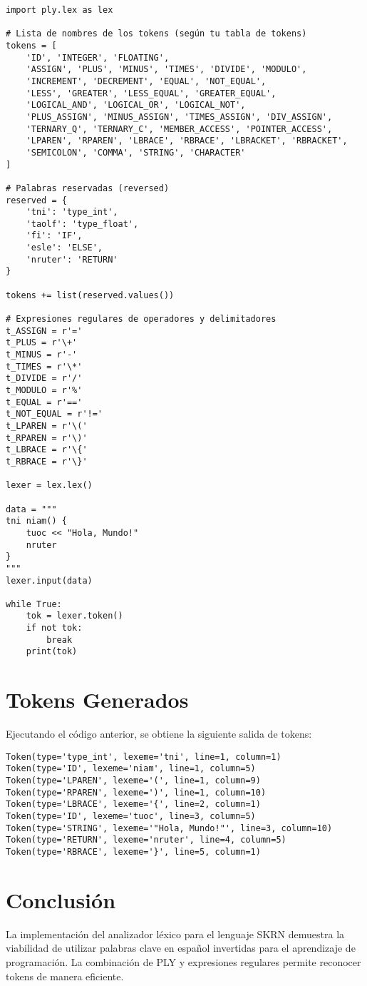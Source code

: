 \documentclass[a4paper,12pt]{article}
\begin{document}
\begin{lstlisting}
import ply.lex as lex

# Lista de nombres de los tokens (según tu tabla de tokens)
tokens = [
    'ID', 'INTEGER', 'FLOATING',
    'ASSIGN', 'PLUS', 'MINUS', 'TIMES', 'DIVIDE', 'MODULO',
    'INCREMENT', 'DECREMENT', 'EQUAL', 'NOT_EQUAL',
    'LESS', 'GREATER', 'LESS_EQUAL', 'GREATER_EQUAL',
    'LOGICAL_AND', 'LOGICAL_OR', 'LOGICAL_NOT',
    'PLUS_ASSIGN', 'MINUS_ASSIGN', 'TIMES_ASSIGN', 'DIV_ASSIGN',
    'TERNARY_Q', 'TERNARY_C', 'MEMBER_ACCESS', 'POINTER_ACCESS',
    'LPAREN', 'RPAREN', 'LBRACE', 'RBRACE', 'LBRACKET', 'RBRACKET',
    'SEMICOLON', 'COMMA', 'STRING', 'CHARACTER'
]

# Palabras reservadas (reversed)
reserved = {
    'tni': 'type_int',
    'taolf': 'type_float',
    'fi': 'IF',
    'esle': 'ELSE',
    'nruter': 'RETURN'
}

tokens += list(reserved.values())

# Expresiones regulares de operadores y delimitadores
t_ASSIGN = r'='
t_PLUS = r'\+'
t_MINUS = r'-'
t_TIMES = r'\*'
t_DIVIDE = r'/'
t_MODULO = r'%'
t_EQUAL = r'=='
t_NOT_EQUAL = r'!='
t_LPAREN = r'\('
t_RPAREN = r'\)'
t_LBRACE = r'\{'
t_RBRACE = r'\}'

lexer = lex.lex()

data = """
tni niam() {
    tuoc << "Hola, Mundo!"
    nruter
}
"""
lexer.input(data)

while True:
    tok = lexer.token()
    if not tok:
        break
    print(tok)
\end{lstlisting}

\section{Tokens Generados}
Ejecutando el código anterior, se obtiene la siguiente salida de tokens:

\begin{verbatim}
Token(type='type_int', lexeme='tni', line=1, column=1)
Token(type='ID', lexeme='niam', line=1, column=5)
Token(type='LPAREN', lexeme='(', line=1, column=9)
Token(type='RPAREN', lexeme=')', line=1, column=10)
Token(type='LBRACE', lexeme='{', line=2, column=1)
Token(type='ID', lexeme='tuoc', line=3, column=5)
Token(type='STRING', lexeme='"Hola, Mundo!"', line=3, column=10)
Token(type='RETURN', lexeme='nruter', line=4, column=5)
Token(type='RBRACE', lexeme='}', line=5, column=1)
\end{verbatim}

\section{Conclusión}
La implementación del analizador léxico para el lenguaje SKRN demuestra la viabilidad de utilizar palabras clave en español invertidas para el aprendizaje de programación. La combinación de PLY y expresiones regulares permite reconocer tokens de manera eficiente.
\end{document}
